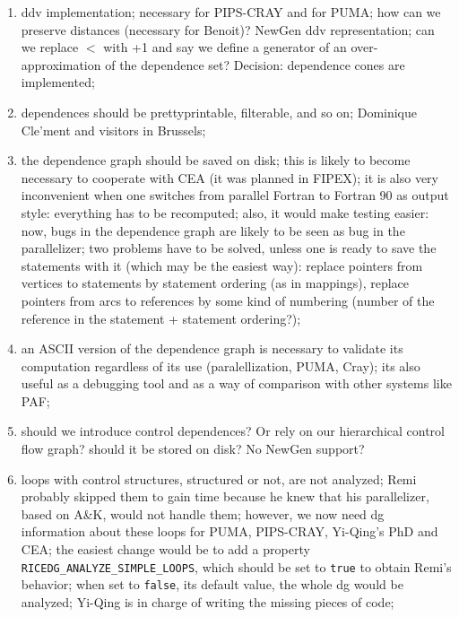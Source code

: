 \begin{enumerate}

  \item ddv implementation; necessary for
        PIPS-CRAY and for PUMA; how can we preserve distances (necessary for
        Benoit)? NewGen ddv representation;  can we replace $<$ with
        +1 and say we define a generator of an over-approximation of the
        dependence set?  Decision: dependence cones are implemented;

  \item {} dependences should be prettyprintable, 
        filterable, and so on; Dominique Cle'ment and visitors in
        Brussels;

  \item the dependence graph should be saved on disk; this is likely
        to become necessary to cooperate with CEA (it was planned
        in FIPEX); it is also very inconvenient when one switches
        from parallel Fortran to Fortran 90 as output style: everything
        has to be recomputed; also, it would make testing easier: now,
        bugs in the dependence graph are likely to be seen as bug in the
        parallelizer; two problems have to be solved, unless one is
        ready to save the statements with it (which may be the easiest
        way): replace pointers from vertices to statements by statement
        ordering (as in mappings), replace pointers from arcs to
        references by some kind of numbering (number of the reference
        in the statement + statement ordering?);

  \item {}
         an ASCII version of the dependence graph is necessary to validate
         its computation regardless of its use (paralellization, PUMA, Cray);
         its also useful as a debugging tool and as a way of comparison with
         other systems like PAF;

  \item should we introduce control dependences?
        Or rely on our hierarchical control flow graph? should it be
        stored on disk? No NewGen support? 

  \item {} loops with control structures, structured or not,
       are not analyzed; Remi probably skipped them to gain time because he
       knew that his parallelizer, based on A\&K, would not handle them;
       however, we now need dg information about these loops for PUMA,
       PIPS-CRAY, Yi-Qing's PhD and CEA; the easiest change would be to add a
       property
\verb+RICEDG_ANALYZE_SIMPLE_LOOPS+, which should be set to
\verb+true+ to obtain Remi's behavior; when set to \verb+false+,
its default value, the whole dg would be analyzed; Yi-Qing is in
charge of writing the missing pieces of code; 


\end{enumerate}
